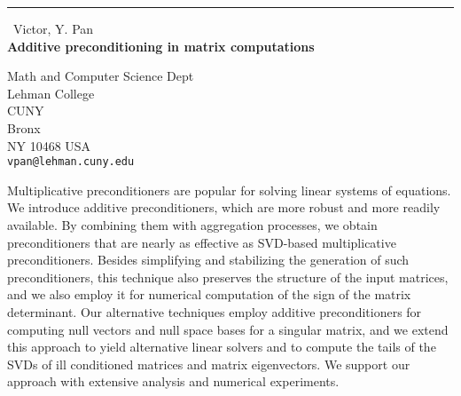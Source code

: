 \documentclass{report}
\begin{document}
\begin{center}
\rule{6in}{1pt} \
{\large Victor, Y. Pan \\
{\bf Additive preconditioning in matrix computations}}

Math and Computer Science Dept \\ Lehman College \\ CUNY \\ Bronx \\ NY 10468 USA
\\
{\tt vpan@lehman.cuny.edu}\end{center}

Multiplicative preconditioners are popular for solving linear systems of
equations. We introduce additive preconditioners, which are more robust
and more readily available. By combining them with aggregation processes,
we obtain preconditioners that are nearly as effective as SVD-based
multiplicative preconditioners. Besides simplifying and stabilizing
the generation of such preconditioners, this technique also preserves
the structure of the input matrices, and we also employ it for numerical
computation of the sign of the matrix determinant. Our alternative
techniques employ additive preconditioners for computing null vectors
and null space bases for a singular matrix, and we extend this approach
to yield alternative linear solvers and to compute the tails of the SVDs
of ill conditioned matrices and matrix eigenvectors. We support our approach
with extensive analysis and numerical experiments.
\end{document}
